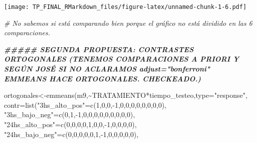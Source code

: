 \documentclass[
]{article}
\newenvironment{Shaded}{\begin{snugshade}}{\end{snugshade}}
\newcommand{\AttributeTok}[1]{\textcolor[rgb]{0.77,0.63,0.00}{#1}}
\newcommand{\CommentTok}[1]{\textcolor[rgb]{0.56,0.35,0.01}{\textit{#1}}}
\newcommand{\DecValTok}[1]{\textcolor[rgb]{0.00,0.00,0.81}{#1}}
\newcommand{\DocumentationTok}[1]{\textcolor[rgb]{0.56,0.35,0.01}{\textbf{\textit{#1}}}}
\newcommand{\FunctionTok}[1]{\textcolor[rgb]{0.00,0.00,0.00}{#1}}
\newcommand{\NormalTok}[1]{#1}
\newcommand{\OtherTok}[1]{\textcolor[rgb]{0.56,0.35,0.01}{#1}}
\newcommand{\SpecialCharTok}[1]{\textcolor[rgb]{0.00,0.00,0.00}{#1}}
\newcommand{\StringTok}[1]{\textcolor[rgb]{0.31,0.60,0.02}{#1}}
\begin{document}
\texttt{[image: TP\_FINAL\_RMarkdown\_files/figure-latex/unnamed-chunk-1-6.pdf]}

\begin{Shaded}
\begin{Highlighting}[]
\CommentTok{\# No sabemos si está comparando bien porque el gráfico no está dividido en las 6 comparaciones.}


\DocumentationTok{\#\#\#\#\# SEGUNDA PROPUESTA: CONTRASTES ORTOGONALES (TENEMOS COMPARACIONES A PRIORI Y SEGÚN JOSÉ SI NO ACLARAMOS adjust="bonferroni" EMMEANS HACE ORTOGONALES. CHECKEADO.)}

\NormalTok{ortogonales}\OtherTok{\textless{}{-}}\FunctionTok{emmeans}\NormalTok{(m9,}\SpecialCharTok{\textasciitilde{}}\NormalTok{TRATAMIENTO}\SpecialCharTok{*}\NormalTok{tiempo\_testeo,}\AttributeTok{type=}\StringTok{"response"}\NormalTok{,}
                \AttributeTok{contr=}\FunctionTok{list}\NormalTok{(}\StringTok{"3hs\_alto\_pos"}\OtherTok{=}\FunctionTok{c}\NormalTok{(}\DecValTok{1}\NormalTok{,}\DecValTok{0}\NormalTok{,}\DecValTok{0}\NormalTok{,}\SpecialCharTok{{-}}\DecValTok{1}\NormalTok{,}\DecValTok{0}\NormalTok{,}\DecValTok{0}\NormalTok{,}\DecValTok{0}\NormalTok{,}\DecValTok{0}\NormalTok{,}\DecValTok{0}\NormalTok{,}\DecValTok{0}\NormalTok{,}\DecValTok{0}\NormalTok{,}\DecValTok{0}\NormalTok{), }
                     \StringTok{"3hs\_bajo\_neg"}\OtherTok{=}\FunctionTok{c}\NormalTok{(}\DecValTok{0}\NormalTok{,}\DecValTok{1}\NormalTok{,}\SpecialCharTok{{-}}\DecValTok{1}\NormalTok{,}\DecValTok{0}\NormalTok{,}\DecValTok{0}\NormalTok{,}\DecValTok{0}\NormalTok{,}\DecValTok{0}\NormalTok{,}\DecValTok{0}\NormalTok{,}\DecValTok{0}\NormalTok{,}\DecValTok{0}\NormalTok{,}\DecValTok{0}\NormalTok{,}\DecValTok{0}\NormalTok{), }
                     \StringTok{"24hs\_alto\_pos"}\OtherTok{=}\FunctionTok{c}\NormalTok{(}\DecValTok{0}\NormalTok{,}\DecValTok{0}\NormalTok{,}\DecValTok{0}\NormalTok{,}\DecValTok{0}\NormalTok{,}\DecValTok{1}\NormalTok{,}\DecValTok{0}\NormalTok{,}\DecValTok{0}\NormalTok{,}\SpecialCharTok{{-}}\DecValTok{1}\NormalTok{,}\DecValTok{0}\NormalTok{,}\DecValTok{0}\NormalTok{,}\DecValTok{0}\NormalTok{,}\DecValTok{0}\NormalTok{), }
                     \StringTok{"24hs\_bajo\_neg"}\OtherTok{=}\FunctionTok{c}\NormalTok{(}\DecValTok{0}\NormalTok{,}\DecValTok{0}\NormalTok{,}\DecValTok{0}\NormalTok{,}\DecValTok{0}\NormalTok{,}\DecValTok{0}\NormalTok{,}\DecValTok{1}\NormalTok{,}\SpecialCharTok{{-}}\DecValTok{1}\NormalTok{,}\DecValTok{0}\NormalTok{,}\DecValTok{0}\NormalTok{,}\DecValTok{0}\NormalTok{,}\DecValTok{0}\NormalTok{,}\DecValTok{0}\NormalTok{), }

\end{Highlighting}
\end{Shaded}
\end{document}
